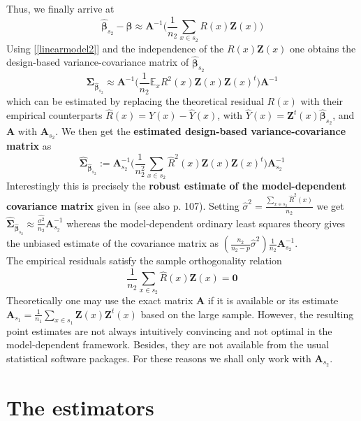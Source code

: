 \documentclass[a4paper,12pt,leqno, titlepage]{article}
\newcommand{\EX}{\mathbb{E}}
\begin{document}
 Thus, we finally arrive at
 \begin{equation}\label{Taylor}
 \hat{\pmb{\beta}}_{s_2}-\pmb{\beta}\approx \pmb{A}^{-1}\Big(\frac{1}{n_2}\sum_{x\in{s_2}}R(x)\pmb{Z}(x)\Big)
 \end{equation}
 Using [\ref{linearmodel2}] and the independence of the $R(x)\pmb{Z}(x)$ one obtains the design-based variance-covariance matrix of
$\hat{\pmb{\beta}}_{s_2}$
\begin{equation}\label{varmatrix}
\pmb{\Sigma}_{\hat{\pmb{\beta}}_{s_2}}\approx
\pmb{A}^{-1}\Big(\frac{1}{n_2}\EX_xR^2(x)\pmb{Z}(x)\pmb{Z}(x)^t\Big)\pmb{A}^{-1}
\end{equation}
which can be estimated by replacing the theoretical residual $R(x)$
with their empirical counterparts
$\hat{R}(x)=Y(x)-\hat{Y}(x)$, with $\hat{Y}(x)=\pmb{Z}^t(x)\hat{\pmb{\beta}}_{s_2}$, and $\pmb{A}$
with $\pmb{A}_{s_2}$. We then get the \textbf{estimated design-based
variance-covariance matrix} as
\begin{equation}\label{estvarmatrix}
\hat{\pmb{\Sigma}}_{\hat{\pmb{\beta}}_{s_2}}:=\pmb{A}_{s_2}^{-1}
\Big(\frac{1}{n_2^2}\sum_{x\in{s_2}}\hat{R}^2(x)\pmb{Z}(x)\pmb{Z}(x)^t\Big)\pmb{A}_{s_2}^{-1}
\end{equation}
Interestingly this is precisely the \textbf{robust estimate of the model-dependent covariance matrix} given in \cite{gregoire2} (see also \cite{mandallaz} p. 107). Setting
$\hat{\sigma}^2=\frac{\sum_{x\in{s_2}}\hat{R}^2(x)}{n_2}$ we get $\hat{\pmb{\Sigma}}_{\hat{\pmb{\beta}}_{s_2}}\approx \frac{\hat{\sigma^2}}{n_2}\pmb{A}_{s_2}^{-1}$ whereas the model-dependent ordinary least squares theory gives the unbiased estimate of the covariance matrix as $(\frac{n_2}{n_2-p}\hat{\sigma}^2)\frac{1}{n_2}\pmb{A}_{s_2}^{-1}$.\\
The empirical residuals satisfy the sample orthogonality relation
\begin{equation}\label{sampleortho}
\frac{1}{n_2}\sum_{x\in{s_2}}\hat{R}(x)\pmb{Z}(x)=\pmb{0}
\end{equation}
Theoretically one may use the exact matrix $\pmb{A}$ if it is available or its estimate $\pmb{A}_{s_1}=\frac{1}{n_1}\sum_{x\in{s_1}}\pmb{Z}(x)\pmb{Z}^t(x)$ based on the large sample. However, the resulting point estimates are not always intuitively convincing and not optimal in the model-dependent framework. Besides, they are not available from the usual statistical software packages. For these reasons we shall only work with $\pmb{A}_{s_2}$.
\section{The estimators}
\end{document}
